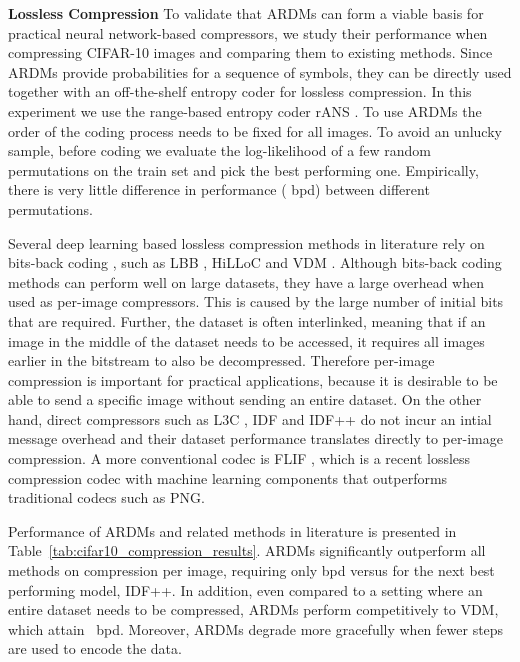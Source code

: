 \documentclass{article} \usepackage{iclr2022_conference,times}
\begin{document}
\textbf{Lossless Compression} \hspace{.2cm}
To validate that ARDMs can form a viable basis for practical neural network-based compressors, we study their performance when compressing CIFAR-10 images and comparing them to existing methods. Since ARDMs provide probabilities for a sequence of symbols, they can be directly used together with an off-the-shelf entropy coder for lossless compression. In this experiment we use the range-based entropy coder rANS \citep{duda2009asymmetric}. To use ARDMs the order of the coding process needs to be fixed for all images. To avoid an unlucky sample, before coding we evaluate the log-likelihood of a few random permutations on the train set and pick the best performing one. Empirically, there is very little difference in performance ( bpd) between different permutations. 

Several deep learning based lossless compression methods in literature rely on bits-back coding \citep{townsend2019bitsback}, such as LBB \citep{ho2019localbitsback}, HiLLoC \citep{townsend2020hilloc} and VDM \citep{kingma2021vdm}. Although bits-back coding methods can perform well on large datasets, they have a large overhead when used as per-image compressors. This is caused by the large number of initial bits that are required. Further, the dataset is often interlinked, meaning that if an image in the middle of the dataset needs to be accessed, it requires all images earlier in the bitstream to also be decompressed. Therefore per-image compression is important for practical applications, because it is desirable to be able to send a specific image without sending an entire dataset. On the other hand, direct compressors such as L3C \citep{mentzer2019practicallossless}, IDF \citep{hoogeboom2019integer} and IDF++ \citep{vdberg2021idfanalyzing} do not incur an intial message overhead and their dataset performance translates directly to per-image compression. A more conventional codec is FLIF \citep{sneyers2016flif}, which is a recent lossless compression codec with machine learning components that outperforms traditional codecs such as PNG.

Performance of ARDMs and related methods in literature is presented in Table~\ref{tab:cifar10_compression_results}. ARDMs significantly outperform all methods on compression per image, requiring only  bpd versus  for the next best performing model, IDF++. In addition, even compared to a setting where an entire dataset needs to be compressed, ARDMs perform competitively to VDM, which attain ~bpd. Moreover, ARDMs degrade more gracefully when fewer steps are used to encode the data.
\end{document}
